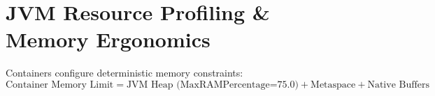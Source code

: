 \section{JVM Resource Profiling \& Memory Ergonomics}

Containers configure deterministic memory constraints:
\begin{equation}
\text{Container Memory Limit} = \text{JVM Heap (MaxRAMPercentage=75.0)} + \text{Metaspace} + \text{Native Buffers}
\end{equation}

\newpage
